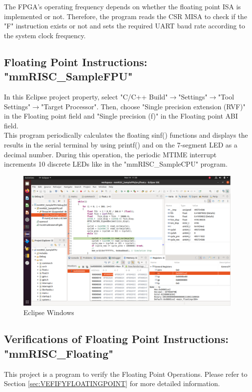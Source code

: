 The FPGA's operating frequency depends on whether the floating point ISA is implemented or not. Therefore, the program reads the CSR MISA to check if the "F" instruction exists or not and sets the required UART baud rate according to the system clock frequency.

\subsection{Floating Point Instructions: "mmRISC\_SampleFPU"}
In this Eclipse project property, select "C/C++ Build"$\rightarrow$"Settings"$\rightarrow$"Tool Settings"$\rightarrow$"Target Processor". Then, choose "Single precision extension (RVF)" in the Floating point field and "Single precision (f)" in the Floating point ABI field.\\

This program periodically calculates the floating sinf() functions and displays the results in the serial terminal by using printf() and on the 7-segment LED as a decimal number. During this operation, the periodic MTIME interrupt increments 10 discrete LEDs like in the "mmRISC\_SampleCPU" program.


\begin{figure}[H]
    \includegraphics[width=1.0\columnwidth]{./Figure/EclipseWindow.png}
    \caption{Eclipse Windows}
    \label{fig:ECLIPSEWINDOW}
\end{figure}

\subsection{Verifications of Floating Point Instructions: "mmRISC\_Floating"}
This project is a program to verify the Floating Point Operations. Please refer to Section \ref{sec:VEFIFYFLOATINGPOINT} for more detailed information.

